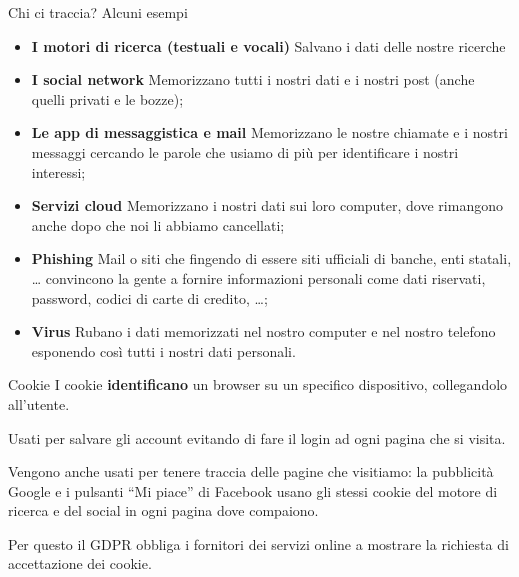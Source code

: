 \begin{myframe}{Chi ci traccia?}
  Alcuni esempi \pause
  \begin{itemize}[<+->]
    \item \textbf{I motori di ricerca (testuali e vocali)} Salvano i dati delle nostre ricerche
    \item \textbf{I social network} Memorizzano tutti i nostri dati e i nostri post (anche quelli privati e le bozze);
    \item \textbf{Le app di messaggistica e mail} Memorizzano le nostre chiamate e i nostri messaggi cercando le parole che usiamo di più per identificare i nostri interessi;
    \item \textbf{Servizi cloud} Memorizzano i nostri dati sui loro computer, dove rimangono anche dopo che noi li abbiamo cancellati;
    \item \textbf{Phishing} Mail o siti che fingendo di essere siti ufficiali di banche, enti statali, \dots{} convincono la gente a fornire informazioni personali come dati riservati, password, codici di carte di credito, \dots;
    \item \textbf{Virus} Rubano i dati memorizzati nel nostro computer e nel nostro telefono esponendo così tutti i nostri dati personali.
  \end{itemize}
\end{myframe}

\begin{myframe}{Cookie}
  I cookie \textbf{identificano} un browser su un specifico dispositivo, collegandolo all'utente.

  Usati per salvare gli account evitando di fare il login ad ogni pagina che si visita.

  \pause\medskip
  Vengono anche usati per tenere traccia delle pagine che visitiamo: la pubblicità Google e i pulsanti ``Mi piace'' di Facebook usano gli stessi cookie del motore di ricerca e del social in ogni pagina dove compaiono.

  Per questo il GDPR obbliga i fornitori dei servizi online a mostrare la richiesta di accettazione dei cookie.
\end{myframe}
